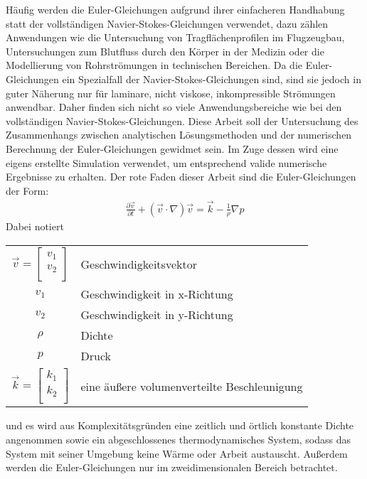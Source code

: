 Häufig werden die Euler-Gleichungen aufgrund ihrer einfacheren Handhabung statt der vollständigen Navier-Stokes-Gleichungen verwendet, dazu zählen Anwendungen wie die Untersuchung von Tragflächenprofilen im Flugzeugbau, Untersuchungen zum Blutfluss durch den Körper in der Medizin oder die Modellierung von Rohrströmungen in technischen Bereichen. Da die Euler-Gleichungen ein Spezialfall der Navier-Stokes-Gleichungen sind, sind sie jedoch in guter Näherung nur für laminare, nicht viskose, inkompressible Strömungen anwendbar. Daher finden sich nicht so viele Anwendungsbereiche wie bei den vollständigen Navier-Stokes-Gleichungen. Diese Arbeit soll der Untersuchung des Zusammenhangs zwischen analytischen Lösungsmethoden und der numerischen Berechnung der Euler-Gleichungen gewidmet sein. Im Zuge dessen wird eine eigens erstellte Simulation verwendet, um entsprechend valide numerische Ergebnisse zu erhalten. Der rote Faden dieser Arbeit sind die Euler-Gleichungen der Form:
\begin{align}
\label{eq:euler}
\frac{\partial \vec{v}}{\partial t} + (\vec{v} \cdot \nabla) \vec{v} = \vec{k} - \frac{1}{\rho} \nabla p
\end{align}
Dabei notiert
\begin{table}[H]
\begin{tabular}{c l}
    $\vec{v} = \begin{bmatrix}
        v_1 \\
        v_2 \\
    \end{bmatrix}$ & Geschwindigkeitsvektor \\
    $v_1$ & Geschwindigkeit in x-Richtung \\
    $v_2$ & Geschwindigkeit in y-Richtung \\
    $\rho$ & Dichte \\
    $p$ & Druck \\
    $\vec{k} = 
    \begin{bmatrix}
        k_1 \\
        k_2 \\
    \end{bmatrix}$ & eine äußere volumenverteilte Beschleunigung
\end{tabular}
\end{table} und es wird aus Komplexitätsgründen eine zeitlich und örtlich konstante Dichte angenommen sowie ein abgeschlossenes thermodynamisches System, sodass das System mit seiner Umgebung keine Wärme oder Arbeit austauscht. Außerdem werden die Euler-Gleichungen nur im zweidimensionalen Bereich betrachtet.

